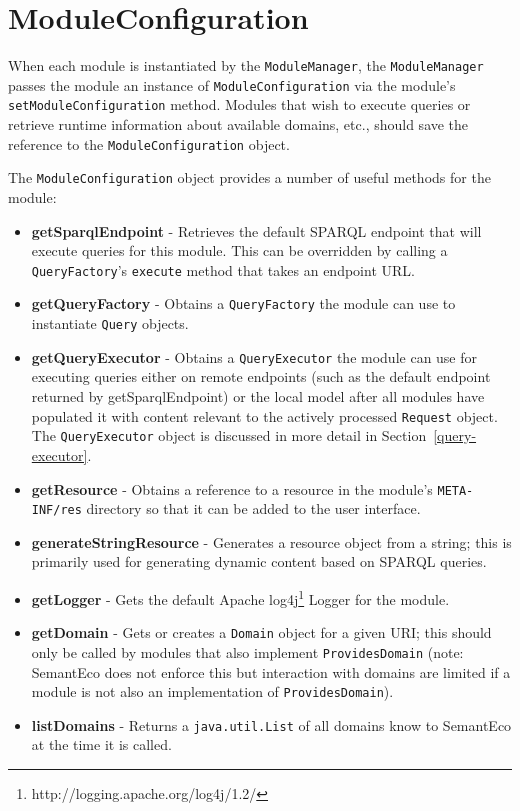 \documentclass[letterpaper]{report}
\begin{document}
\section{ModuleConfiguration}
When each module is instantiated by the \texttt{ModuleManager}, the \texttt{ModuleManager} passes the module an instance of \texttt{ModuleConfiguration} via the module's \texttt{setModuleConfiguration} method. Modules that wish to execute queries or retrieve runtime information about available domains, etc., should save the reference to the \texttt{ModuleConfiguration} object.

The \texttt{ModuleConfiguration} object provides a number of useful methods for the module:

\begin{itemize}
\item\textbf{getSparqlEndpoint} - Retrieves the default SPARQL endpoint that will execute queries for this module. This can be overridden by calling a \texttt{QueryFactory}'s \texttt{execute} method that takes an endpoint URL.
\item\textbf{getQueryFactory} - Obtains a \texttt{QueryFactory} the module can use to instantiate \texttt{Query} objects.
\item\textbf{getQueryExecutor} - Obtains a \texttt{QueryExecutor} the module can use for executing queries either on remote endpoints (such as the default endpoint returned by getSparqlEndpoint) or the local model after all modules have populated it with content relevant to the actively processed \texttt{Request} object. The \texttt{QueryExecutor} object is discussed in more detail in Section~\ref{query-executor}.
\item\textbf{getResource} - Obtains a reference to a resource in the module's \texttt{META-INF/res} directory so that it can be added to the user interface.
\item\textbf{generateStringResource} - Generates a resource object from a string; this is primarily used for generating dynamic content based on SPARQL queries.
\item\textbf{getLogger} - Gets the default Apache log4j\footnote{http://logging.apache.org/log4j/1.2/} Logger for the module.
\item\textbf{getDomain} - Gets or creates a \texttt{Domain} object for a given URI; this should only be called by modules that also implement \texttt{ProvidesDomain} (note: SemantEco does not enforce this but interaction with domains are limited if a module is not also an implementation of \texttt{ProvidesDomain}).
\item\textbf{listDomains} - Returns a \texttt{java.util.List} of all domains know to SemantEco at the time it is called.
\end{itemize}
\end{document}
